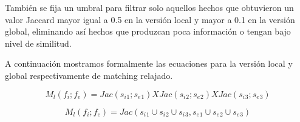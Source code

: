 Tambi\'en se fija un umbral para filtrar solo aquellos hechos que obtuvieron un valor Jaccard mayor igual a 0.5 en la versi\'on local y mayor a 0.1 en la versi\'on global, eliminando as\'i hechos que produzcan poca informaci\'on o tengan bajo nivel de similitud.

A continuaci\'on mostramos formalmente las ecuaciones para la versi\'on local y global respectivamente de matching relajado.

\begin{equation}
	\label{eq:jaccard1}
           M{_l}(f{_i}; f{_e}) = Jac(s{_i}{_1} ; s{_e}{_1} ) X Jac(s{_i}{_2} ; s{_e}{_2} ) X Jac(s{_i}{_3} ; s{_e}{_3})
\end{equation}

\begin{equation}
	\label{eq:jaccard2}
           M{_l}(f{_i}; f{_e}) = Jac (s{_i}{_1} \cup s{_i}{_2} \cup s{_i}{_3}, s{_e}{_1} \cup s{_e}{_2} \cup s{_e}{_3})
\end{equation} 